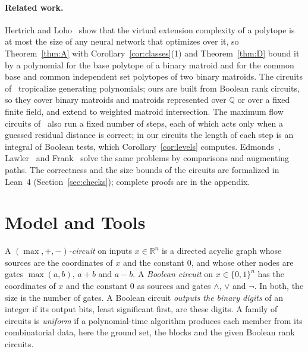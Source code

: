 \documentclass[runningheads,envcountsame]{llncs}
\newcommand{\R}{\mathbb R}
\begin{document}
\paragraph{Related work.}
Hertrich and Loho~\cite{hertrich-loho26} show that the virtual extension
complexity of a polytope is at most the size of any neural network that
optimizes over it, so Theorem~\ref{thm:A} with Corollary~\ref{cor:classes}(1) and
Theorem~\ref{thm:D} bound it by a polynomial for the base polytope of a binary
matroid and for the common base and common independent set polytopes of two
binary matroids.  The circuits of~\cite{fgk16,hertrich-kober-loho26}
tropicalize generating polynomials; ours are built from Boolean rank circuits,
so they cover binary matroids and matroids represented over $\mathbb Q$ or over
a fixed finite field, and extend to weighted matroid intersection.  The maximum flow circuits of~\cite{hertrich-sering25} also run a fixed number
of steps, each of which acts only when a guessed residual distance is correct;
in our circuits the length of each step is an integral of Boolean tests, which
Corollary~\ref{cor:levels} computes.
Edmonds~\cite{edmonds70,edmonds71}, Lawler~\cite{lawler75} and
Frank~\cite{frank81} solve the same problems by comparisons and augmenting
paths.  The correctness and the size bounds of the circuits are formalized in
Lean~4 (Section~\ref{sec:checks}); complete proofs are in the appendix.

\section{Model and Tools}
\label{sec:model}

\begin{definition}
\label{def:circuits}
A \emph{$(\max,+,-)$-circuit} on inputs $x\in\R^{n}$ is a directed acyclic
graph whose sources are the coordinates of $x$ and the constant $0$, and whose
other nodes are gates $\max(a,b)$, $a+b$ and $a-b$.  A \emph{Boolean circuit} on
$x\in\{0,1\}^{n}$ has the coordinates of $x$ and the constant $0$ as sources and
gates $\wedge$, $\vee$ and $\neg$.  In both, the size is the number of gates.  A
Boolean circuit \emph{outputs the binary digits} of an integer if its output
bits, least significant first, are these digits.  A family of circuits
is \emph{uniform} if a polynomial-time algorithm produces each member from its
combinatorial data, here the ground set, the blocks and the given Boolean rank
circuits.
\end{definition}
\end{document}
